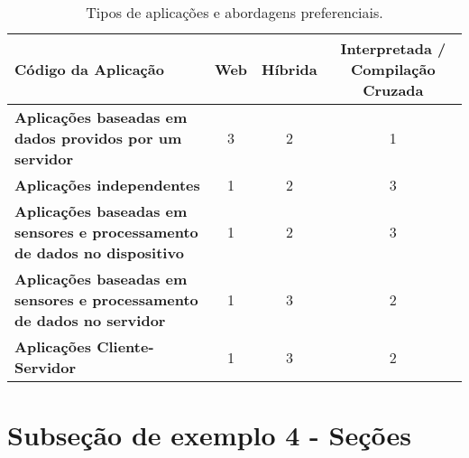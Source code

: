 \begin{table}[!htb]
	\centering
	\caption{\label{tab:crossplatform} Tipos de aplicações e abordagens preferenciais.}
	\begin{adjustbox}{max width=\textwidth}
		\begin{tabular}{@{} p{5cm} ccc @{}}
		\toprule
		\textbf{Código da Aplicação} & \textbf{Web} & \textbf{Híbrida} & \textbf{Interpretada / Compilação Cruzada} \\ \hline

		\textbf{Aplicações baseadas em dados providos por um servidor} &
			3 & 2 & 1
		\\ \hline

		\textbf{Aplicações independentes} & 1 & 2 & 3\\ \hline

		\textbf{Aplicações baseadas em sensores e processamento de dados no dispositivo} & 1 & 2 & 3\\ \hline

		\textbf{Aplicações baseadas em sensores e processamento de dados no servidor} & 1 & 3 & 2\\ \hline

		\textbf{Aplicações Cliente-Servidor} & 1 & 3 & 2 \\ \bottomrule
	\end{tabular}
	\end{adjustbox}
\end{table}


\section{Subseção de exemplo 4 - Seções}